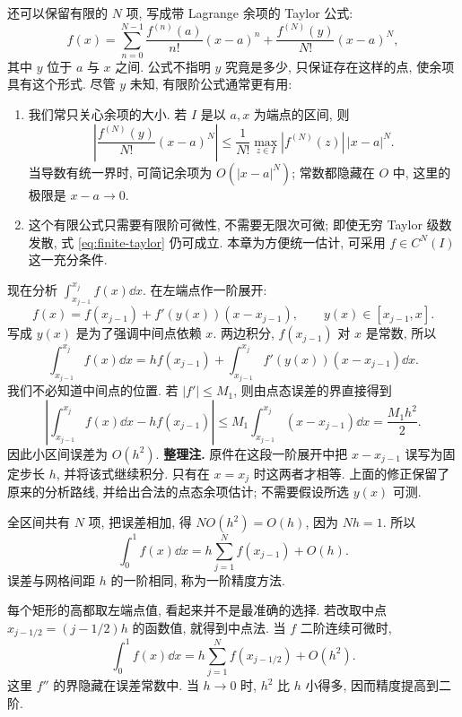 还可以保留有限的 $N$ 项, 写成带 Lagrange 余项的 Taylor 公式:
\begin{equation}\label{eq:finite-taylor}
f(x)=\sum_{n=0}^{N-1}\frac{f^{(n)}(a)}{n!}(x-a)^n+\frac{f^{(N)}(y)}{N!}(x-a)^N,
\end{equation}
其中 $y$ 位于 $a$ 与 $x$ 之间. 公式不指明 $y$ 究竟是多少, 只保证存在这样的点, 使余项具有这个形式. 尽管 $y$ 未知, 有限阶公式通常更有用:
\begin{enumerate}
\item 我们常只关心余项的大小. 若 $I$ 是以 $a,x$ 为端点的区间, 则
\[
\left|\frac{f^{(N)}(y)}{N!}(x-a)^N\right|\leq\frac1{N!}\max_{z\in I}|f^{(N)}(z)|\,|x-a|^N.
\]
当导数有统一界时, 可简记余项为 $O(|x-a|^N)$; 常数都隐藏在 $O$ 中, 这里的极限是 $x-a\to0$.
\item 这个有限公式只需要有限阶可微性, 不需要无限次可微; 即使无穷 Taylor 级数发散, 式 \eqref{eq:finite-taylor} 仍可成立. 本章为方便统一估计, 可采用 $f\in C^N(I)$ 这一充分条件.
\end{enumerate}

现在分析 $\int_{x_{j-1}}^{x_j}f(x)\dd x$. 在左端点作一阶展开:
\[
f(x)=f(x_{j-1})+f'(y(x))(x-x_{j-1}),\qquad y(x)\in[x_{j-1},x].
\]
写成 $y(x)$ 是为了强调中间点依赖 $x$. 两边积分, $f(x_{j-1})$ 对 $x$ 是常数, 所以
\[
\int_{x_{j-1}}^{x_j}f(x)\dd x
=hf(x_{j-1})+\int_{x_{j-1}}^{x_j}f'(y(x))(x-x_{j-1})\dd x.
\]
我们不必知道中间点的位置. 若 $|f'|\leq M_1$, 则由点态误差的界直接得到
\[
\left|\int_{x_{j-1}}^{x_j}f(x)\dd x-hf(x_{j-1})\right|
\leq M_1\int_{x_{j-1}}^{x_j}(x-x_{j-1})\dd x=\frac{M_1h^2}{2}.
\]
因此小区间误差为 $O(h^2)$. \textbf{整理注.} 原件在这段一阶展开中把 $x-x_{j-1}$ 误写为固定步长 $h$, 并将该式继续积分. 只有在 $x=x_j$ 时这两者才相等. 上面的修正保留了原来的分析路线, 并给出合法的点态余项估计; 不需要假设所选 $y(x)$ 可测.

全区间共有 $N$ 项, 把误差相加, 得 $N O(h^2)=O(h)$, 因为 $Nh=1$. 所以
\begin{equation}\label{eq:rectangle}
\int_0^1 f(x)\dd x=h\sum_{j=1}^{N}f(x_{j-1})+O(h).
\end{equation}
误差与网格间距 $h$ 的一阶相同, 称为一阶精度方法.

每个矩形的高都取左端点值, 看起来并不是最准确的选择. 若改取中点 $x_{j-1/2}=(j-1/2)h$ 的函数值, 就得到中点法. 当 $f$ 二阶连续可微时,
\begin{equation}\label{eq:midpoint-quadrature}
\int_0^1 f(x)\dd x=h\sum_{j=1}^{N}f(x_{j-1/2})+O(h^2).
\end{equation}
这里 $f''$ 的界隐藏在误差常数中. 当 $h\to0$ 时, $h^2$ 比 $h$ 小得多, 因而精度提高到二阶.

